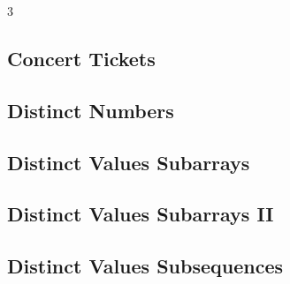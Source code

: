 \documentclass[8pt]{extarticle}
\begin{document}
\begin{multicols*}{3}
\subsection{Concert Tickets}
\begin{caixaenunciado}

\end{caixaenunciado}
\vspace{0.3cm}


\subsection{Distinct Numbers}
\begin{caixaenunciado}

\end{caixaenunciado}
\vspace{0.3cm}


\subsection{Distinct Values Subarrays}
\begin{caixaenunciado}

\end{caixaenunciado}
\vspace{0.3cm}


\subsection{Distinct Values Subarrays II}
\begin{caixaenunciado}

\end{caixaenunciado}
\vspace{0.3cm}


\subsection{Distinct Values Subsequences}
\begin{caixaenunciado}

\end{caixaenunciado}
\vspace{0.3cm}



\end{multicols*}
\end{document}
